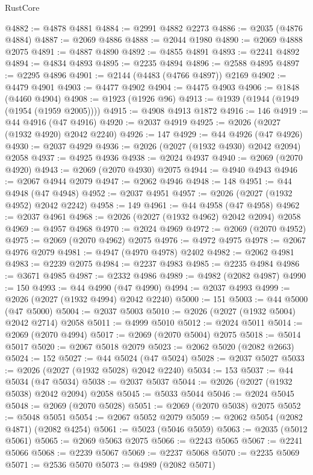 \begin{lexlean}{RustCore}
\begin{coremodule}
@4882 := @4878 @4881
@4884 := @2991 @4882 @2273
@4886 := @2035 (@4876 @4884)
@4887 := @2069 @4886
@4888 := @2044 @1980
@4890 := @2069 @4888 @2075
@4891 := @4887 @4890
@4892 := @4855 @4891
@4893 := @2241 @4892
@4894 := @4834 @4893
@4895 := @2235 @4894
@4896 := @2588 @4895
@4897 := @2295 @4896
@4901 := @2144 (@4483 (@4766 @4897)) @2169
@4902 := @4479 @4901
@4903 := @4477 @4902
@4904 := @4475 @4903
@4906 := @1848 (@4460 @4904)
@4908 := @1923 (@1926 @96)
@4913 := @1939 (@1944 (@1949 (@1954 (@1959 @2005))))
@4915 := @4908 @4913 @1872
@4916 := 146
@4919 := @44 @4916 (@47 @4916)
@4920 := @2037 @4919
@4925 := @2026 (@2027 (@1932 @4920) @2042 @2240)
@4926 := 147
@4929 := @44 @4926 (@47 @4926)
@4930 := @2037 @4929
@4936 := @2026 (@2027 (@1932 @4930) @2042 @2094) @2058
@4937 := @4925 @4936
@4938 := @2024 @4937
@4940 := @2069 (@2070 @4920)
@4943 := @2069 (@2070 @4930) @2075
@4944 := @4940 @4943
@4946 := @2067 @4944 @2079
@4947 := @2062 @4946
@4948 := 148
@4951 := @44 @4948 (@47 @4948)
@4952 := @2037 @4951
@4957 := @2026 (@2027 (@1932 @4952) @2042 @2242)
@4958 := 149
@4961 := @44 @4958 (@47 @4958)
@4962 := @2037 @4961
@4968 := @2026 (@2027 (@1932 @4962) @2042 @2094) @2058
@4969 := @4957 @4968
@4970 := @2024 @4969
@4972 := @2069 (@2070 @4952)
@4975 := @2069 (@2070 @4962) @2075
@4976 := @4972 @4975
@4978 := @2067 @4976 @2079
@4981 := @4947 (@4970 @4978) @2402
@4982 := @2062 @4981
@4983 := @2239 @2075
@4984 := @2237 @4983
@4985 := @2235 @4984
@4986 := @3671 @4985
@4987 := @2332 @4986
@4989 := @4982 (@2082 @4987)
@4990 := 150
@4993 := @44 @4990 (@47 @4990)
@4994 := @2037 @4993
@4999 := @2026 (@2027 (@1932 @4994) @2042 @2240)
@5000 := 151
@5003 := @44 @5000 (@47 @5000)
@5004 := @2037 @5003
@5010 := @2026 (@2027 (@1932 @5004) @2042 @2714) @2058
@5011 := @4999 @5010
@5012 := @2024 @5011
@5014 := @2069 (@2070 @4994)
@5017 := @2069 (@2070 @5004) @2075
@5018 := @5014 @5017
@5020 := @2067 @5018 @2079
@5023 := @2062 @5020 (@2082 @2663)
@5024 := 152
@5027 := @44 @5024 (@47 @5024)
@5028 := @2037 @5027
@5033 := @2026 (@2027 (@1932 @5028) @2042 @2240)
@5034 := 153
@5037 := @44 @5034 (@47 @5034)
@5038 := @2037 @5037
@5044 := @2026 (@2027 (@1932 @5038) @2042 @2094) @2058
@5045 := @5033 @5044
@5046 := @2024 @5045
@5048 := @2069 (@2070 @5028)
@5051 := @2069 (@2070 @5038) @2075
@5052 := @5048 @5051
@5054 := @2067 @5052 @2079
@5059 := @2062 @5054 (@2082 @4871) (@2082 @4254)
@5061 := @5023 (@5046 @5059)
@5063 := @2035 (@5012 @5061)
@5065 := @2069 @5063 @2075
@5066 := @2243 @5065
@5067 := @2241 @5066
@5068 := @2239 @5067
@5069 := @2237 @5068
@5070 := @2235 @5069
@5071 := @2536 @5070
@5073 := @4989 (@2082 @5071)

\end{coremodule}
\end{lexlean}
